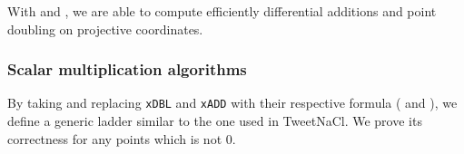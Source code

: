 With  and , we are able to compute efficiently
differential additions and point doubling on projective coordinates.

\subsubsection{Scalar multiplication algorithms}
\label{subsec:ECC-ladder}

By taking  and replacing \texttt{xDBL} and \texttt{xADD}
with their respective formula ( and ),
we define a generic ladder  similar to the one used in
TweetNaCl. We prove its correctness for any points which \xcoord is not 0.


%
%

